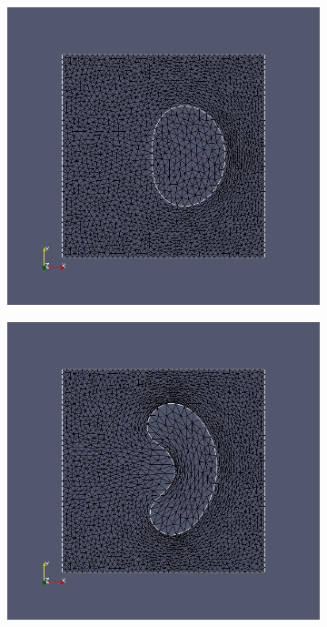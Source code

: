 \begin{figure}
	\begin{subfigure}{0.315\textwidth}
	\centering
	\includegraphics[scale=0.21]{pic_brokendonut_bfgs_konstlame_6.jpg}
	\caption{}	
	\end{subfigure}
	\begin{subfigure}{0.315\textwidth}
	\centering
	\includegraphics[scale=0.21]{pic_brokendonut_bfgs_konstlame_12.jpg}

\end{subfigure}
\end{figure}
